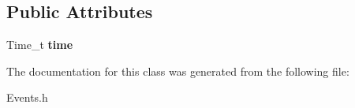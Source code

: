 \subsection*{Public Attributes}
\begin{DoxyCompactItemize}
\item 
\hypertarget{class_event_base_aa12d9278a8b9577b1a19099963a75702}{Time\-\_\-t {\bfseries time}}\label{class_event_base_aa12d9278a8b9577b1a19099963a75702}

\end{DoxyCompactItemize}


The documentation for this class was generated from the following file\-:\begin{DoxyCompactItemize}
\item 
Events.\-h\end{DoxyCompactItemize}
